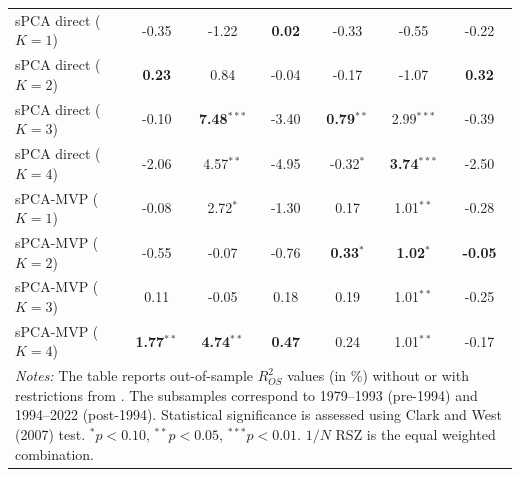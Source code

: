 \documentclass[a4paper,11pt]{article}
\begin{document}
\begin{table}[H]
\begin{tabular}{lcccccc}
\hline
sPCA direct ($K=1$) 
& -0.35 & -1.22 & \textbf{0.02} 
& -0.33 & -0.55 & -0.22 \\
sPCA direct ($K=2$) 
& \textbf{0.23} & 0.84 & -0.04 
& -0.17 & -1.07 & \textbf{0.32} \\
sPCA direct ($K=3$) 
& -0.10 & \textbf{7.48}$^{***}$ & -3.40 
& \textbf{0.79}$^{**}$ & 2.99$^{***}$ & -0.39 \\
sPCA direct ($K=4$) 
& -2.06 & 4.57$^{**}$ & -4.95 
& -0.32$^{*}$ & \textbf{3.74}$^{***}$ & -2.50 \\
\hline
sPCA-MVP ($K=1$) 
& -0.08 & 2.72$^{*}$ & -1.30 
& 0.17 & 1.01$^{**}$ & -0.28 \\
sPCA-MVP ($K=2$) 
& -0.55 & -0.07 & -0.76 
& \textbf{0.33}$^{*}$ & \textbf{1.02}$^{*}$ & \textbf{-0.05} \\
sPCA-MVP ($K=3$) 
& 0.11 & -0.05 & 0.18 
& 0.19 & 1.01$^{**}$ & -0.25 \\
sPCA-MVP ($K=4$) 
& \textbf{1.77}$^{**}$ & \textbf{4.74}$^{**}$ & \textbf{0.47} 
& 0.24 & 1.01$^{**}$ & -0.17 \\
\hline
\multicolumn{7}{p{0.85\textwidth}}{\footnotesize \textit{Notes:} The table reports out-of-sample $R^2_{OS}$ values (in \%) without or with restrictions from \citet{campbellthompson2008}. The subsamples correspond to
1979--1993 (pre-1994) and 1994--2022 (post-1994). Statistical significance is
assessed using Clark and West (2007) test. $^{*}p < 0.10$, $^{**}p < 0.05$, $^{***}p < 0.01$. $1/N$ RSZ is the \citet{rsz2010} equal weighted combination.} 
\end{tabular}
\end{table}
\end{document}
